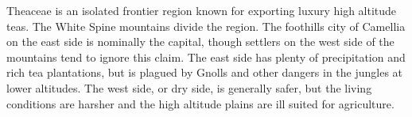 Theaceae is an isolated frontier region known for exporting luxury high altitude teas.
The White Spine mountains divide the region.
The foothills city of Camellia on the east side is nominally the capital, though settlers on the west side of the mountains tend to ignore this claim.
The east side has plenty of precipitation and rich tea plantations, but is plagued by Gnolls and other dangers in the jungles at lower altitudes.
The west side, or dry side, is generally safer, but the living conditions are harsher and the high altitude plains are ill suited for agriculture.
